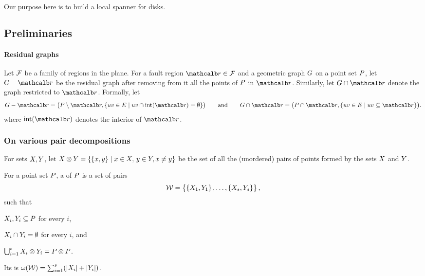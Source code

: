 \documentclass[12pt]{article}%
\begin{document}
Our purpose here is to build a local spanner for disks.

\subsection{Preliminaries}


\paragraph{Residual graphs}

Let $\mathcal{F}$ be a family of regions in the plane. For a fault region
$\region \in \FF$ and a geometric graph $G$ on a point set $P$, let
$\G \gminus \region$ be the residual graph after removing from it all
the points of $P$ in $\region$. Similarly, let
$\restrictY{\G}{\region}$ denote the graph restricted to $\region$.
Formally, let
\begin{equation*}
    \G \gminus \region%
    =%
    \bigl( \PS \setminus \region, \Set{ uv \in \EG }{ uv \cap
       \interiorX{\region} = \emptyset} \bigr)
    \qquad\text{and}\qquad%
    \restrictY{\G}{\region}%
    =%
    \bigl( \PS \cap {\region},
    \Set{uv \in \EG}{ uv \subseteq {\region} } \bigr).
\end{equation*}
where $\interiorX{\region}$ denotes the interior of $\region$.


\subsubsection{On various pair decompositions}

For sets $X, Y$, let
\begin{math}
    \PSX \otimes \PSY%
    =%
    \Set{\brc{\px,\py}}{ \px\in \PSX,\, \py\in \PSY, \px \ne \py }
\end{math}
be the set of all the (unordered) pairs of points formed by the sets
$X$ and $Y$.

\begin{defn}
    For a point set $P$, a  of $P$ is a set of pairs
    \begin{equation*}
        \mathcal{W} = \left\{ {\bigl. \left\{ {X_1,Y_1} \right\},\ldots,\left\{ {X_s,Y_s} \right\}} \right\},
    \end{equation*}
    such that
    \begin{enumerate*}[label=(\Roman*)]
        \item $X_i,Y_i\subseteq P$ for every $i$,
        \item $X_i \cap Y_i = \emptyset$ for every $i$, and
        \item
        $\bigcup_{i=1}^s X_i \otimes Y_i = P \otimes P$.
    \end{enumerate*}
    Its  is
    $\WeightX{\WS} = \sum_{i=1}^s \pth{ \cardin{\PSX_i } +
       \cardin{\PSY_i}}$.
\end{defn}
\end{document}
